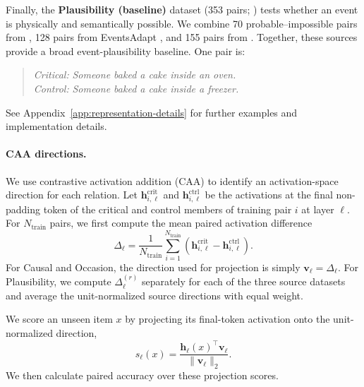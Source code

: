 \documentclass[11pt]{article}
\begin{document}
Finally, the \textbf{Plausibility (baseline)} dataset (353 pairs; ) tests whether an event is physically and semantically possible. We combine 70 probable--impossible pairs from \citet{hu-etal-2025-shades}, 128 pairs from EventsAdapt \citep{kauf-etal-2023-event}, and 155 pairs from \citet{vega-mendoza-etal-2021-concurrent}. Together, these sources provide a broad event-plausibility baseline. One pair is:
\begin{quote}
\textit{Critical:} \emph{Someone baked a cake inside an oven.}\\
\textit{Control:} \emph{Someone baked a cake inside a freezer.}
\end{quote}
See Appendix~\ref{app:representation-details} for further examples and implementation details.



\paragraph{CAA directions.} We use contrastive activation addition (CAA) \citep{rimsky-etal-2024-steering} to identify an activation-space direction for each relation. Let $\mathbf{h}^{\mathrm{crit}}_{i,\ell}$ and $\mathbf{h}^{\mathrm{ctrl}}_{i,\ell}$ be the activations at the final non-padding token of the critical and control members of training pair $i$ at layer $\ell$. For $N_{\mathrm{train}}$ pairs, we first compute the mean paired activation difference
\begin{equation}
\Delta_{\ell}=\frac{1}{N_{\mathrm{train}}}\sum_{i=1}^{N_{\mathrm{train}}}
\left(\mathbf{h}^{\mathrm{crit}}_{i,\ell}-\mathbf{h}^{\mathrm{ctrl}}_{i,\ell}\right).
\label{eq:caa-direction-main}
\end{equation}
For Causal and Occasion, the direction used for projection is simply $\mathbf{v}_{\ell}=\Delta_{\ell}$. For Plausibility, we compute $\Delta^{(r)}_{\ell}$ separately for each of the three source datasets and average the unit-normalized source directions with equal weight.

We score an unseen item $x$ by projecting its final-token activation onto the unit-normalized direction,
\begin{equation}
s_{\ell}(x)=
\frac{\mathbf{h}_{\ell}(x)^{\top}\mathbf{v}_{\ell}}
{\lVert\mathbf{v}_{\ell}\rVert_2}.
\label{eq:caa-score-main}
\end{equation}
We then calculate paired accuracy over these projection scores. %
\end{document}
